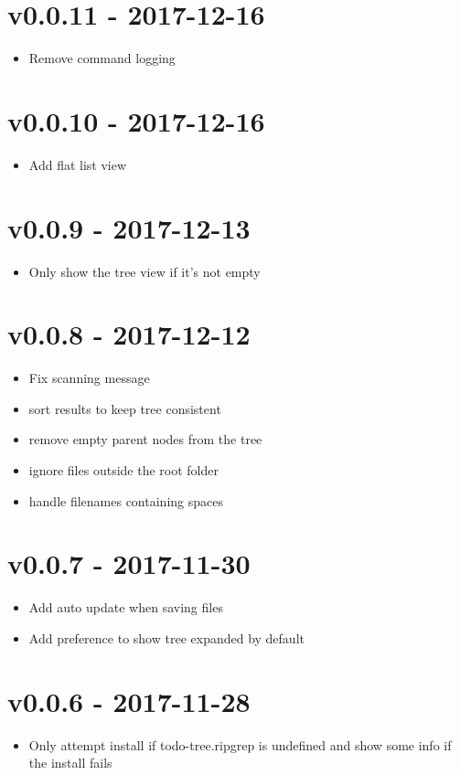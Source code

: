 \chapter{v0.0.11 - 2017-12-16}
\begin{itemize}
\item{Remove command logging}
\end{itemize}

\chapter{v0.0.10 - 2017-12-16}
\begin{itemize}
\item{Add flat list view}
\end{itemize}

\chapter{v0.0.9 - 2017-12-13}
\begin{itemize}
\item{Only show the tree view if it's not empty}
\end{itemize}

\chapter{v0.0.8 - 2017-12-12}
\begin{itemize}
\item{Fix scanning message}
\item{sort results to keep tree consistent}
\item{remove empty parent nodes from the tree}
\item{ignore files outside the root folder}
\item{handle filenames containing spaces}
\end{itemize}

\chapter{v0.0.7 - 2017-11-30}
\begin{itemize}
\item{Add auto update when saving files}
\item{Add preference to show tree expanded by default}
\end{itemize}

\chapter{v0.0.6 - 2017-11-28}
\begin{itemize}
\item{Only attempt install if todo-tree.ripgrep is undefined and show some info if the install fails}
\end{itemize}


